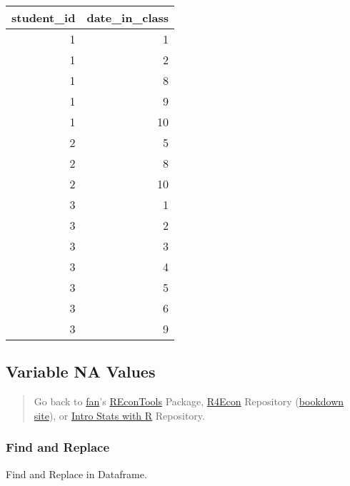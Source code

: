 \documentclass[
]{book}
\begin{document}
\begin{table}[!h]
\centering
\begin{tabular}{r|r}
\hline
student\_id & date\_in\_class\\
\hline
\rowcolor{gray!6}  1 & 1\\
\hline
1 & 2\\
\hline
\rowcolor{gray!6}  1 & 8\\
\hline
1 & 9\\
\hline
\rowcolor{gray!6}  1 & 10\\
\hline
2 & 5\\
\hline
\rowcolor{gray!6}  2 & 8\\
\hline
2 & 10\\
\hline
\rowcolor{gray!6}  3 & 1\\
\hline
3 & 2\\
\hline
\rowcolor{gray!6}  3 & 3\\
\hline
3 & 4\\
\hline
\rowcolor{gray!6}  3 & 5\\
\hline
3 & 6\\
\hline
\rowcolor{gray!6}  3 & 9\\
\hline
\end{tabular}
\end{table}

\hypertarget{variable-na-values}{%
\subsection{Variable NA Values}\label{variable-na-values}}

\begin{quote}
Go back to \href{http://fanwangecon.github.io/}{fan}'s \href{https://fanwangecon.github.io/REconTools/}{REconTools} Package, \href{https://fanwangecon.github.io/R4Econ/}{R4Econ} Repository (\href{https://fanwangecon.github.io/R4Econ/bookdown}{bookdown site}), or \href{https://fanwangecon.github.io/Stat4Econ/}{Intro Stats with R} Repository.
\end{quote}

\hypertarget{find-and-replace}{%
\subsubsection{Find and Replace}\label{find-and-replace}}

Find and Replace in Dataframe.
\end{document}
